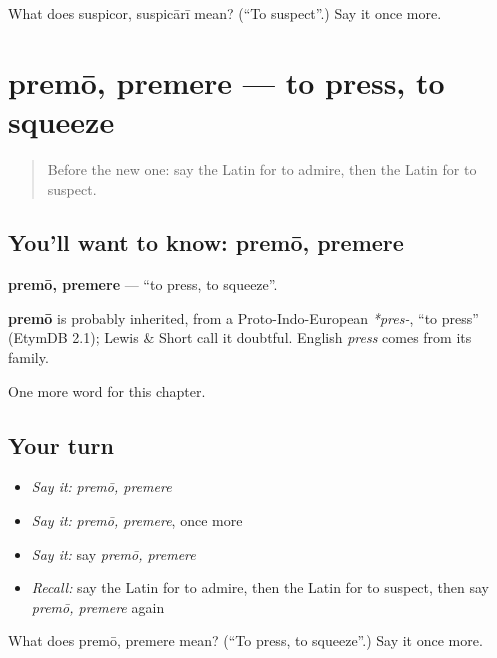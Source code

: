 \begin{tcolorbox}[breakable,colback=teal!4,colframe=teal!35!black,title={Before you move on}]
What does suspicor, suspicārī mean? (\textquotedblleft{}To suspect\textquotedblright{}.) Say it once more.
\end{tcolorbox}
\section[premō, premere]{premō, premere — to press, to squeeze}

\label{lesson:LA-C170-premo}



\begin{quote}
Before the new one: say the Latin for to admire, then the Latin for to suspect.
\end{quote}

\subsection*{You'll want to know: premō, premere}
\textbf{premō, premere} — \textquotedblleft{}to press, to squeeze\textquotedblright{}.

\begin{cousinweb}
\textbf{premō} is probably inherited, from a Proto-Indo-European \emph{*pres-}, \textquotedblleft{}to press\textquotedblright{} (EtymDB 2.1); Lewis \& Short call it doubtful. English \emph{press} comes from its family.
\end{cousinweb}

\begin{grammarlens}[title={What you've built}]
One more word for this chapter.
\end{grammarlens}

\subsection*{Your turn}
\begin{itemize}
\raggedright
  \item \emph{Say it:} \emph{premō, premere}
  \item \emph{Say it:} \emph{premō, premere}, once more
  \item \emph{Say it:} say \emph{premō, premere}
  \item \emph{Recall:} say the Latin for to admire, then the Latin for to suspect, then say \emph{premō, premere} again
\end{itemize}

\begin{tcolorbox}[breakable,colback=teal!4,colframe=teal!35!black,title={Before you move on}]
What does premō, premere mean? (\textquotedblleft{}To press, to squeeze\textquotedblright{}.) Say it once more.
\end{tcolorbox}
